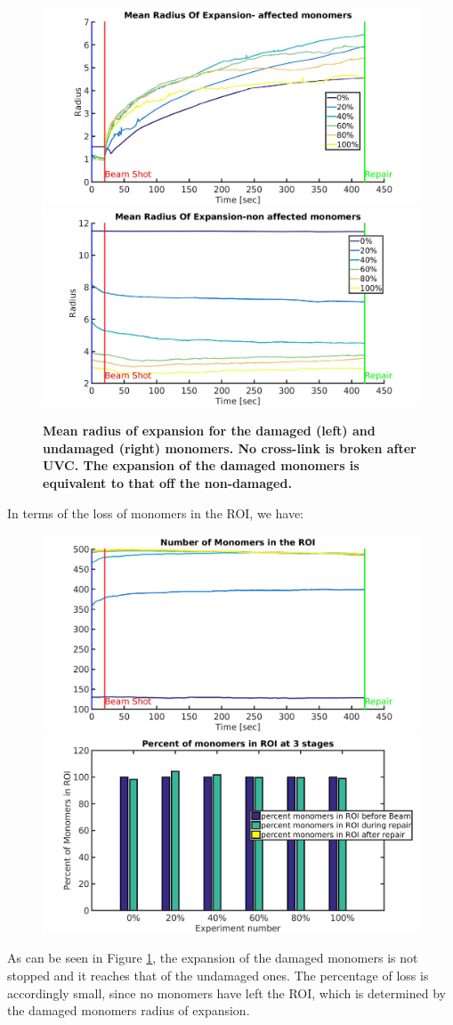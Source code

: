 \documentclass[12pt]{report}
\begin{document}
	\begin{figure}[H]
	\includegraphics[width=0.5\linewidth]{Images/expandNonDamaged/NoCrosslinksBroken/meanRadiusOfExpansionAffected}
	\includegraphics[width=0.5\linewidth]{Images/expandNonDamaged/NoCrosslinksBroken/meanRadiusOfExpansionNonAffected}
	\caption{\tiny{\textbf{Mean radius of expansion for the damaged (left) and undamaged (right) monomers. No cross-link is broken after UVC. The expansion of the damaged monomers is equivalent to that off the non-damaged.}}}
	\label{fig:meanRadiusOfExpansionBendingNonAffecteNoBrokenCrosslinks}
	\end{figure}
	In terms of the loss of monomers in the ROI, we have:
	
	\begin{figure}[H]
	\includegraphics[width=0.5\linewidth, height=0.3\textheight]{Images/expandNonDamaged/NoCrosslinksBroken/meanNumMonomersInROI}
	\includegraphics[width=0.5\linewidth, height=0.3\textheight]{Images/expandNonDamaged/NoCrosslinksBroken/percentageOfMonomersInROI}
	\caption{}
	\label{fig:meanNumMonomersInROINoBrokenCrosslinks}
	\end{figure}
    As can be seen in Figure \ref{fig:meanRadiusOfExpansionBendingNonAffecteNoBrokenCrosslinks}, the expansion of the damaged monomers is not stopped and it reaches that of the undamaged ones. The percentage of loss is accordingly small, since no monomers have left the ROI, which is determined by the damaged monomers radius of expansion. 
    
\end{document}
